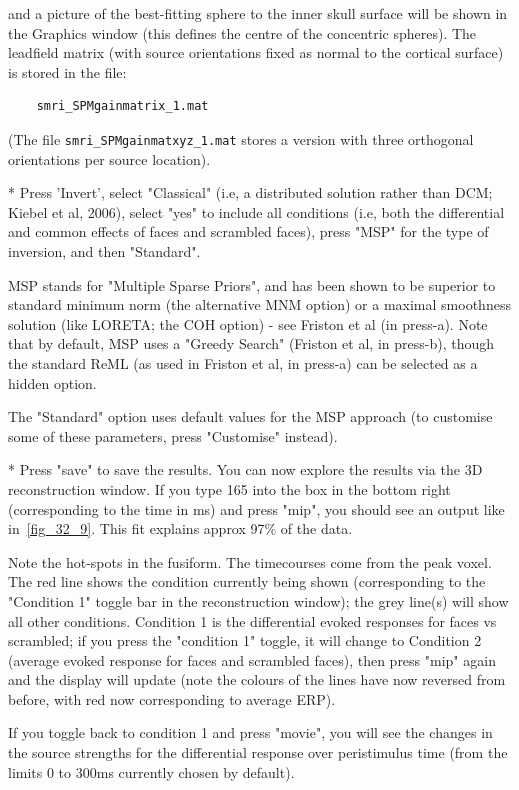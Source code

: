 and a picture of the best-fitting sphere to the inner skull surface will be shown in the Graphics window (this defines the centre of the concentric spheres). The leadfield matrix (with source orientations fixed as normal to the cortical surface) is stored in the file:
\begin{verbatim}
	smri_SPMgainmatrix_1.mat
\end{verbatim}
(The file \verb!smri_SPMgainmatxyz_1.mat! stores a version with three orthogonal orientations per source location).

* Press 'Invert', select "Classical" (i.e, a distributed solution rather than DCM; Kiebel et al, 2006), select "yes" to include all conditions (i.e, both the differential and common effects of faces and scrambled faces), press "MSP" for the type of inversion, and then "Standard".

MSP stands for "Multiple Sparse Priors", and has been shown to be superior to standard minimum norm (the alternative MNM option) or a maximal smoothness solution (like LORETA; the COH option) - see Friston et al (in press-a). Note that by default, MSP uses a "Greedy Search" (Friston et al, in press-b), though the standard ReML (as used in Friston et al, in press-a) can be selected as a hidden option.

The "Standard" option uses default values for the MSP approach (to customise some of these parameters, press "Customise" instead).

* Press "save" to save the results. You can now explore the results via the 3D reconstruction window. If you type 165 into the box in the bottom right (corresponding to the time in ms) and press "mip", you should see an output like in~\ref{fig_32_9}. This fit explains approx 97\% of the data.

Note the hot-spots in the fusiform. The timecourses come from the peak voxel. The red line shows the condition currently being shown (corresponding to the "Condition 1" toggle bar in the reconstruction window); the grey line(s) will show all other conditions. Condition 1 is the differential evoked responses for faces vs scrambled; if you press the "condition 1" toggle, it will change to Condition 2 (average evoked response for faces and scrambled faces), then press "mip" again and the display will update (note the colours of the lines have now reversed from before, with red now corresponding to average ERP).

If you toggle back to condition 1 and press "movie", you will see the changes in the source strengths for the differential response over peristimulus time (from the limits 0 to 300ms currently chosen by default).

